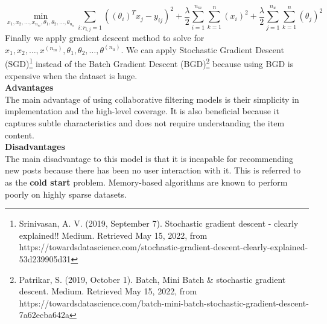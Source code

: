 \begin{equation*}
\min_{x_{1},x_{2}, \dots,x_{n_{m}}, \theta_{1},\theta_{2}, \dots, \theta_{n_{u}} } 
\sum_{i:r_{i,j} = 1}\left((\theta_{i})^{T}x_{j}-y_{ij}\right)^{2} + 
\frac{\lambda}{2}
\sum_{i=1}^{n_{m}}
\sum_{k = 1}^{n}(x_{i})^{2}+
\frac{\lambda}{2}
\sum_{j=1}^{n_{u}}
\sum_{k = 1}^{n}(\theta_{j})^{2}
\end{equation*}
Finally we apply gradient descent method to solve for $x_{1},x_{2}, \dots,x^{(n_{m})}, \theta_{1},\theta_{2}, \dots, \theta^{(n_{u})}$. We can apply Stochastic Gradient Descent (SGD)\footnote{Srinivasan, A. V. (2019, September 7). Stochastic gradient descent - clearly explained!! Medium. Retrieved May 15, 2022, from https://towardsdatascience.com/stochastic-gradient-descent-clearly-explained-53d239905d31 } instead of the Batch Gradient Descent (BGD)\footnote{Patrikar, S. (2019, October 1). Batch, Mini Batch \& stochastic gradient descent. Medium. Retrieved May 15, 2022, from https://towardsdatascience.com/batch-mini-batch-stochastic-gradient-descent-7a62ecba642a} because using BGD is expensive when the dataset is huge. 
\\\textbf{Advantages}
\\The main advantage of using collaborative filtering models is their simplicity in implementation and the high-level coverage. It is also beneficial because it captures subtle characteristics and does not require understanding the item content.
\\ \textbf{Disadvantages}
\\The main disadvantage to this model is that it is incapable  for recommending new posts because there has been no user interaction with it. This is referred to as the \textbf{cold start} problem. Memory-based algorithms are known to perform poorly on highly sparse datasets.


